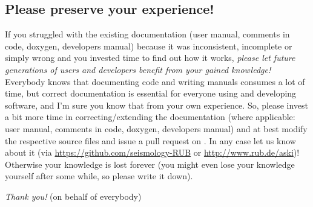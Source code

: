 \subsection*{Please preserve your experience!}
If you struggled with the existing \ASKI{} documentation (user manual, comments in code, doxygen, developers 
manual) because it was inconsistent, incomplete or simply wrong and you invested time to find out how it works, 
\emph{please let future generations of users and developers benefit from your gained knowledge!}
Everybody knows that documenting code and writing manuals consumes a lot of time, but correct documentation 
is essential for everyone using and developing software, and I'm sure you know that from your own experience.
So, please invest a bit more time in correcting/extending the \ASKI{} documentation
(where applicable: user manual, comments in code, doxygen, developers manual) and
at best modify the respective source files and issue a pull request on . In any case let us 
know about it (via \url{https://github.com/seismology-RUB} or \url{http://www.rub.de/aski})!
Otherwise your knowledge is lost forever (you might even lose your knowledge yourself after some while, 
so please write it down).

\emph{Thank you!} (on behalf of everybody)

%
